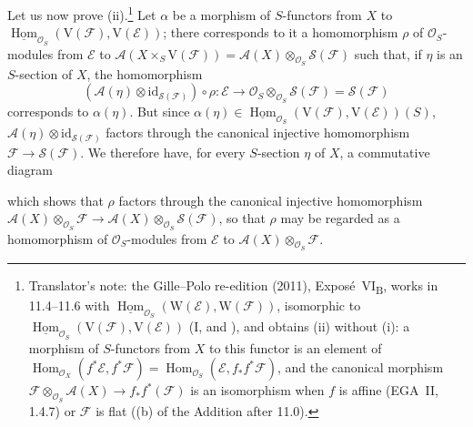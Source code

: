 Let us now prove \textup{(ii)}.\footnote{Translator's note: the Gille--Polo re-edition (2011),
Expos\'e~VI\textsubscript{B}, works in 11.4--11.6 with
\(\underline{\operatorname{Hom}}_{\mathcal O_S}(\mathrm W(\mathcal E),\mathrm W(\mathcal F))\), isomorphic to
\(\underline{\operatorname{Hom}}_{\mathcal O_S}(\mathrm V(\mathcal F),\mathrm V(\mathcal E))\) (I,
 and ), and obtains (ii)
without (i): a morphism of \(S\)-functors from \(X\) to this functor is an element of
\(\operatorname{Hom}_{\mathcal O_X}(f^*\mathcal E,f^*\mathcal F)=\operatorname{Hom}_{\mathcal O_S}(\mathcal E,f_*f^*\mathcal F)\),
and the canonical morphism \(\mathcal F\otimes_{\mathcal O_S}\mathcal A(X)\to f_*f^*(\mathcal F)\) is an isomorphism
when \(f\) is affine (EGA~II, 1.4.7) or \(\mathcal F\) is flat ((b) of the Addition after 11.0).} Let \(\alpha\) be a morphism of \(S\)-functors from
\(X\) to \(\underline{\operatorname{Hom}}_{\mathcal O_S}(\mathrm V(\mathcal F),\mathrm V(\mathcal E))\);
there corresponds to it a homomorphism \(\rho\) of \(\mathcal O_S\)-modules from
\(\mathcal E\) to
\(\mathcal A(X\times_S\mathrm V(\mathcal F))=\mathcal A(X)\otimes_{\mathcal O_S}\mathcal S(\mathcal F)\)
such that, if \(\eta\) is an \(S\)-section of \(X\), the homomorphism
\[
  (\mathcal A(\eta)\otimes\mathrm{id}_{\mathcal S(\mathcal F)})\circ\rho:
  \mathcal E\longrightarrow\mathcal O_S\otimes_{\mathcal O_S}\mathcal S(\mathcal F)
  =\mathcal S(\mathcal F)
\]
corresponds to \(\alpha(\eta)\). But since
\(\alpha(\eta)\in\underline{\operatorname{Hom}}_{\mathcal O_S}(\mathrm V(\mathcal F),\mathrm V(\mathcal E))(S)\),
\(\mathcal A(\eta)\otimes\mathrm{id}_{\mathcal S(\mathcal F)}\) factors through the
canonical injective homomorphism \(\mathcal F\to\mathcal S(\mathcal F)\). We
therefore have, for every \(S\)-section \(\eta\) of \(X\), a commutative diagram
\begin{center}
\end{center}
which shows that \(\rho\) factors through the canonical injective homomorphism
\(\mathcal A(X)\otimes_{\mathcal O_S}\mathcal F\to
\mathcal A(X)\otimes_{\mathcal O_S}\mathcal S(\mathcal F)\), so that \(\rho\) may be
regarded as a homomorphism of \(\mathcal O_S\)-modules from \(\mathcal E\) to
\(\mathcal A(X)\otimes_{\mathcal O_S}\mathcal F\).

